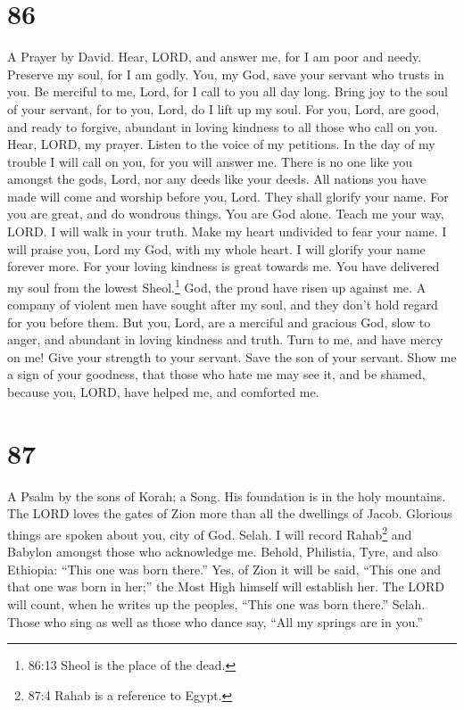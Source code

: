 \hypertarget{section-78}{%
\section{86}\label{section-78}}

A Prayer by David.  Hear, LORD, and answer me, for I am poor
and needy.  Preserve my soul, for I am godly. You, my God,
save your servant who trusts in you.  Be merciful to me,
Lord, for I call to you all day long.  Bring joy to the soul
of your servant, for to you, Lord, do I lift up my soul. 
For you, Lord, are good, and ready to forgive, abundant in loving
kindness to all those who call on you.  Hear, LORD, my
prayer. Listen to the voice of my petitions.  In the day of
my trouble I will call on you, for you will answer me. 
There is no one like you amongst the gods, Lord, nor any deeds like your
deeds.  All nations you have made will come and worship
before you, Lord. They shall glorify your name.  For you
are great, and do wondrous things. You are God alone. 
Teach me your way, LORD. I will walk in your truth. Make my heart
undivided to fear your name.  I will praise you, Lord my
God, with my whole heart. I will glorify your name forever more.
 For your loving kindness is great towards me. You have
delivered my soul from the lowest Sheol.\footnote{86:13 Sheol is the
  place of the dead.}  God, the proud have risen up against
me. A company of violent men have sought after my soul, and they don't
hold regard for you before them.  But you, Lord, are a
merciful and gracious God, slow to anger, and abundant in loving
kindness and truth.  Turn to me, and have mercy on me! Give
your strength to your servant. Save the son of your servant.
 Show me a sign of your goodness, that those who hate me
may see it, and be shamed, because you, LORD, have helped me, and
comforted me.

\hypertarget{section-79}{%
\section{87}\label{section-79}}

A Psalm by the sons of Korah; a Song.  His foundation is in
the holy mountains.  The LORD loves the gates of Zion more
than all the dwellings of Jacob.  Glorious things are spoken
about you, city of God. Selah.  I will record
Rahab\footnote{87:4 Rahab is a reference to Egypt.} and Babylon amongst
those who acknowledge me. Behold, Philistia, Tyre, and also Ethiopia:
``This one was born there.''  Yes, of Zion it will be said,
``This one and that one was born in her;'' the Most High himself will
establish her.  The LORD will count, when he writes up the
peoples, ``This one was born there.'' Selah.  Those who sing
as well as those who dance say, ``All my springs are in you.''

